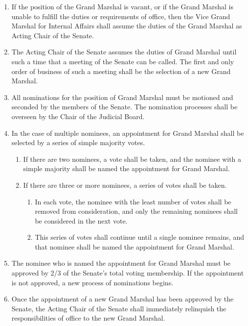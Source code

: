 \documentclass{uniondoc}
\begin{document}

\begin{enumerate}
	\item If the position of the Grand Marshal is vacant, or if the Grand Marshal is unable to fulfill the duties or requirements of office, then the Vice Grand Marshal for Internal Affairs shall assume the duties of the Grand Marshal as Acting Chair of the Senate.
	\item The Acting Chair of the Senate assumes the duties of Grand Marshal until such a time that a meeting of the Senate can be called.
	      The first and only order of business of such a meeting shall be the selection of a new Grand Marshal.
	\item All nominations for the position of Grand Marshal must be motioned and seconded by the members of the Senate.
	      The nomination processes shall be overseen by the Chair of the Judicial Board.
	\item In the case of multiple nominees, an appointment for Grand Marshal shall be selected by a series of simple majority votes.
	      \begin{enumerate}
		      \item If there are two nominees, a vote shall be taken,
		            and the nominee with a simple majority shall be named the appointment for Grand Marshal.
		      \item If there are three or more nominees, a series of votes shall be taken.
		            \begin{enumerate}
			            \item In each vote, the nominee with the least number of votes shall be removed from consideration,
			                  and only the remaining nominees shall be considered in the next vote.
			            \item This series of votes shall continue until a single nominee remains,
			                  and that nominee shall be named the appointment for Grand Marshal.
		            \end{enumerate}
	      \end{enumerate}
	\item The nominee who is named the appointment for Grand Marshal must be approved by 2/3 of the Senate’s total voting membership.
	      If the appointment is not approved, a new process of nominations begins.
	\item Once the appointment of a new Grand Marshal has been approved by the Senate, the Acting Chair of the Senate shall immediately relinquish the responsibilities of office to the new Grand Marshal.
\end{enumerate}
\end{document}
